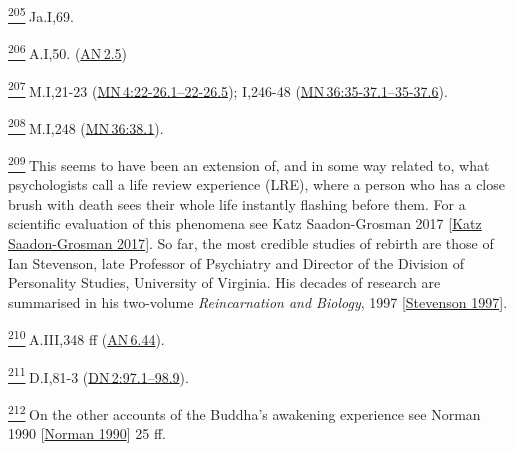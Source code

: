 \label{footprints_split_024.html_fn205}
\hyperref[footprints_split_009.htmlux5cux23fnref205]{\textsuperscript{205}} Ja.I,69.

\label{footprints_split_024.html_fn206}
\hyperref[footprints_split_009.htmlux5cux23fnref206]{\textsuperscript{206}} A.I,50.
(\href{https://suttacentral.net/an2.5/en/sujato}{AN\,2.5})

\label{footprints_split_024.html_fn207}
\hyperref[footprints_split_009.htmlux5cux23fnref207]{\textsuperscript{207}} M.I,21-23
(\href{https://suttacentral.net/mn4/en/sujato\#22-26.1}{MN\,4:22-26.1--22-26.5});
I,246-48
(\href{https://suttacentral.net/mn36/en/sujato\#35-37.1}{MN\,36:35-37.1--35-37.6}).

\label{footprints_split_024.html_fn208}
\hyperref[footprints_split_009.htmlux5cux23fnref208]{\textsuperscript{208}} M.I,248
(\href{https://suttacentral.net/mn36/en/sujato\#38.1}{MN\,36:38.1}).

\label{footprints_split_024.html_fn209}
\hyperref[footprints_split_009.htmlux5cux23fnref209]{\textsuperscript{209}} This
seems to have been an extension of, and in some way related to, what
psychologists call a life review experience (LRE), where a person who
has a close brush with death sees their whole life instantly flashing
before them. For a scientific evaluation of this phenomena see {Katz
Saadon-Grosman 2017
{{[}\hyperref[footprints_split_023.htmlux5cux23Katzux5cux2520Saadon-Grosmanux5cux25202017]{Katz
Saadon-Grosman 2017}{]}}}. So far, the most credible studies of rebirth
are those of Ian Stevenson, late Professor of Psychiatry and Director of
the Division of Personality Studies, University of Virginia. His decades
of research are summarised in his two-volume {\emph{Reincarnation and
Biology}, 1997
{{[}\hyperref[footprints_split_023.htmlux5cux23Stevensonux5cux25201997]{Stevenson
1997}{]}}}.

\label{footprints_split_024.html_fn210}
\hyperref[footprints_split_009.htmlux5cux23fnref210]{\textsuperscript{210}} A.III,348
ff (\href{https://suttacentral.net/an6.44/en/sujato}{AN\,6.44}).

\label{footprints_split_024.html_fn211}
\hyperref[footprints_split_009.htmlux5cux23fnref211]{\textsuperscript{211}} D.I,81-3
(\href{https://suttacentral.net/dn2/en/sujato\#97.1}{DN\,2:97.1--98.9}).

\label{footprints_split_024.html_fn212}
\hyperref[footprints_split_009.htmlux5cux23fnref212]{\textsuperscript{212}} On
the other accounts of the Buddha's awakening experience see {Norman 1990
{{[}\hyperref[footprints_split_022.htmlux5cux23Normanux5cux25201990]{Norman
1990}{]}}} 25 ff.

